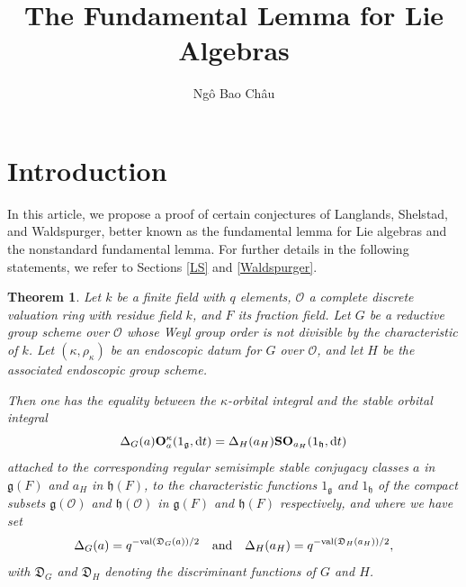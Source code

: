 \documentclass[12pt,english]{smfart}
\numberwithin{equation}{subsection}
\newtheorem{theorem}{Theorem}
\theoremstyle{remark}
\newcommand\calO{{\mathscr O}}
\newcommand\frakg{{\mathfrak g}}
\newcommand\frakh{\mathfrak h}
\newcommand\discrim{\mathfrak D}
\begin{document}
\title{The Fundamental Lemma for Lie Algebras}
\author{Ng\^o Bao Ch\^au}
\address{\newline
Institute for Advanced Study, Einstein Drive, Princeton NJ 08540, USA.
Department of Mathematics, Paris-Sud University, 91405 Orsay,
France.} 
\date{}
\maketitle

\setcounter{tocdepth}{2}
\begin{small}
\tableofcontents
\end{small}


\section*[Intro]{Introduction}

In this article, we propose a proof of certain conjectures of Langlands, Shelstad, and Waldspurger, better known as the fundamental lemma for Lie algebras and the nonstandard fundamental lemma. For further details in the following statements, we refer to Sections \ref{LS} and \ref{Waldspurger}.

\begin{theorem}
Let $k$ be a finite field with $q$ elements, $\calO$ a complete discrete valuation ring with residue field $k$, and $F$ its fraction field. Let $G$ be a reductive group scheme over $\calO$ whose Weyl group order is not divisible by the characteristic of $k$. Let $(\kappa,\rho_\kappa)$ be an endoscopic datum for $G$ over $\calO$, and let $H$ be the associated endoscopic group scheme.

Then one has the equality between the $\kappa$-orbital integral and the stable orbital integral
$$
\Delta_G(a){\bf O}_a^\kappa(1_{\frakg},{\rm d}t)=\Delta_H(a_H){\bf SO}_{a_H}(1_{\frakh},{\rm d}t)
$$
attached to the corresponding regular semisimple stable conjugacy classes $a$ in $\frakg(F)$ and $a_H$ in $\frakh(F)$, to the characteristic functions $1_{\frakg}$ and $1_{\frakh}$ of the compact subsets $\frakg(\calO)$ and $\frakh(\calO)$ in $\frakg(F)$ and $\frakh(F)$ respectively, and where we have set
$$
\Delta_G(a)=q^{-{\rm val}(\discrim_G(a))/ 2}\quad \text{and}\quad \Delta_H(a_H)=q^{-{\rm val}(\discrim_H(a_H))/ 2},
$$
with $\discrim_G$ and $\discrim_H$ denoting the discriminant functions of $G$ and $H$.
\end{theorem}
\end{document}
